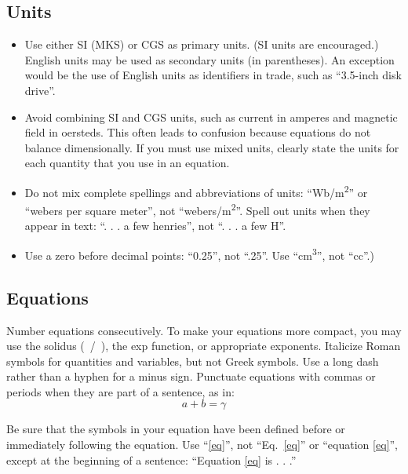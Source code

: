 \documentclass[conference]{IEEEtran}
\begin{document}
\subsection{Units}
\begin{itemize}
\item Use either SI (MKS) or CGS as primary units. (SI units are encouraged.) English units may be used as secondary units (in parentheses). An exception would be the use of English units as identifiers in trade, such as ``3.5-inch disk drive''.
\item Avoid combining SI and CGS units, such as current in amperes and magnetic field in oersteds. This often leads to confusion because equations do not balance dimensionally. If you must use mixed units, clearly state the units for each quantity that you use in an equation.
\item Do not mix complete spellings and abbreviations of units: ``Wb/m\textsuperscript{2}'' or ``webers per square meter'', not ``webers/m\textsuperscript{2}''. Spell out units when they appear in text: ``. . . a few henries'', not ``. . . a few H''.
\item Use a zero before decimal points: ``0.25'', not ``.25''. Use ``cm\textsuperscript{3}'', not ``cc''.)
\end{itemize}

\subsection{Equations}
Number equations consecutively. To make your 
equations more compact, you may use the solidus (~/~), the exp function, or 
appropriate exponents. Italicize Roman symbols for quantities and variables, 
but not Greek symbols. Use a long dash rather than a hyphen for a minus 
sign. Punctuate equations with commas or periods when they are part of a 
sentence, as in:
\begin{equation}
a+b=\gamma\label{eq}
\end{equation}

Be sure that the 
symbols in your equation have been defined before or immediately following 
the equation. Use ``\eqref{eq}'', not ``Eq.~\eqref{eq}'' or ``equation \eqref{eq}'', except at 
the beginning of a sentence: ``Equation \eqref{eq} is . . .''
\end{document}
